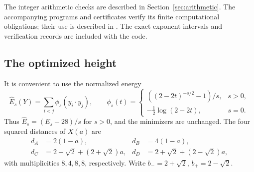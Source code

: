 \documentclass[12pt,reqno]{amsart}
\theoremstyle{definition}
\newcommand{\Eh}{\widehat E}
\numberwithin{equation}{section}
\begin{document}
The integer arithmetic checks are described in
Section~\ref{sec:arithmetic}. The accompanying programs and certificates
verify its finite computational obligations; their use is described in
. The exact exponent intervals and verification records are
included with the code.

\subsection{The optimized height}
It is convenient to use the normalized energy
\[
 \Eh_s(Y)=\sum_{i<j}\phi_s(y_i\cdot y_j),\qquad
 \phi_s(t)=
 \begin{cases}((2-2t)^{-s/2}-1)/s,&s>0,\\
 -\tfrac12\log(2-2t),&s=0.
 \end{cases}
\]
Thus $\Eh_s=(E_s-28)/s$ for $s>0$, and the minimizers are unchanged.
The four squared distances of $X(a)$ are
\begin{equation}\label{eq:distances}
\begin{aligned}
 d_A&=2(1-a),& d_B&=4(1-a),\\
 d_C&=2-\sqrt2+(2+\sqrt2)a,&
 d_D&=2+\sqrt2+(2-\sqrt2)a,
\end{aligned}
\end{equation}
with multiplicities $8,4,8,8$, respectively. Write
$b_-=2+\sqrt2$, $b_+=2-\sqrt2$.
\end{document}
